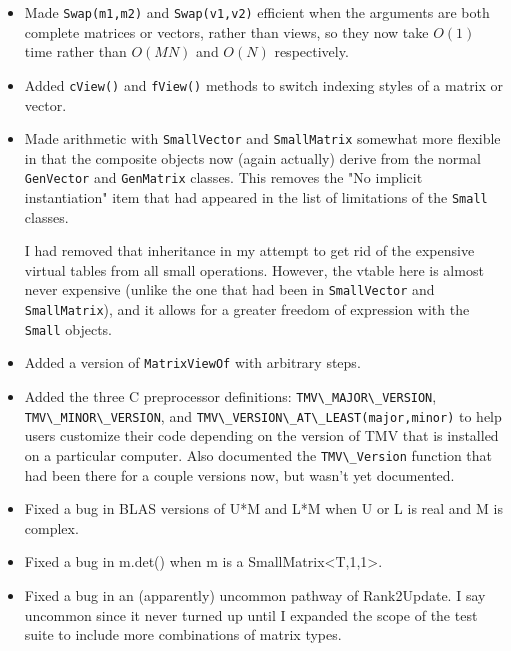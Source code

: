 \documentclass[twoside,letterpaper,11pt]{article}
\renewcommand{\tt}[1]{{\lstinline {#1}}}
\begin{document}
\begin{description}
\begin{itemize}
\item Made \tt{Swap(m1,m2)} and \tt{Swap(v1,v2)} efficient when the arguments are both
complete matrices or vectors, rather than views, so they now take $O(1)$ time rather than
$O(MN)$ and $O(N)$ respectively.

\item Added \tt{cView()} and \tt{fView()} methods to switch indexing styles of a matrix or vector.

\item Made arithmetic with \tt{SmallVector} and \tt{SmallMatrix} somewhat more flexible in that
the composite objects now (again actually) derive from the normal \tt{GenVector} and
\tt{GenMatrix} classes.  This removes the "No implicit instantiation" item that had appeared
in the list of limitations of the \tt{Small} classes.

I had removed that inheritance in my attempt to get rid of the expensive virtual
tables from all small operations.  However, the vtable here is almost never expensive 
(unlike the one that had been in \tt{SmallVector} and \tt{SmallMatrix}), and
it allows for a greater freedom of expression with the \tt{Small} objects.

\item Added a version of \tt{MatrixViewOf} with arbitrary steps.

\item Added the three C preprocessor definitions: \tt{TMV\_MAJOR\_VERSION}, 
\tt{TMV\_MINOR\_VERSION},
and \tt{TMV\_VERSION\_AT\_LEAST(major,minor)} to help users customize
their code depending on the version of TMV that is installed on a particular
computer.  Also documented the \tt{TMV\_Version} function that had been there
for a couple versions now, but wasn't yet documented.

\item Fixed a bug in BLAS versions of U*M and L*M when U or L is real and
M is complex.

\item Fixed a bug in m.det() when m is a SmallMatrix<T,1,1>.

\item Fixed a bug in an (apparently) uncommon pathway of Rank2Update.
I say uncommon since it never turned up until I expanded the scope of
the test suite to include more combinations of matrix types.

\end{itemize}

\end{description}
\end{document}

